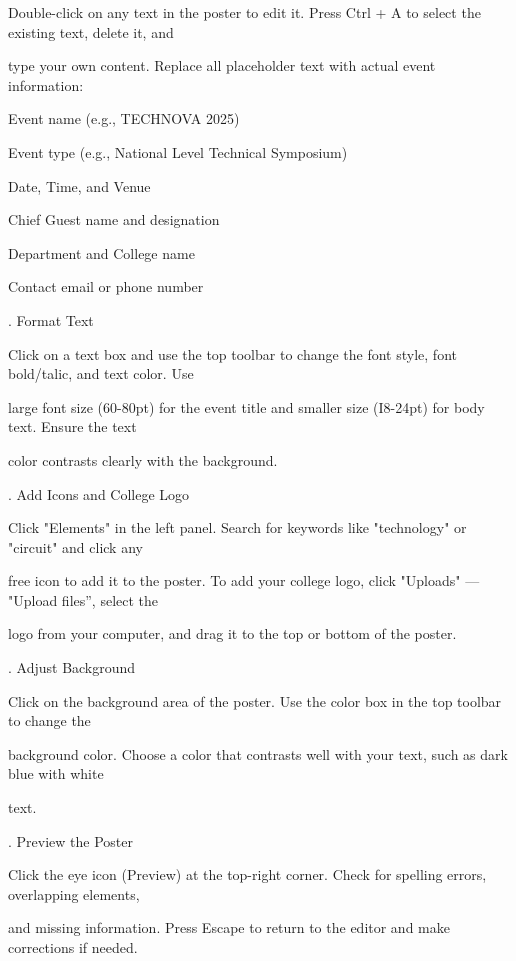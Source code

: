 \documentclass[10pt,a4paper]{article}
\begin{document}
\noindent Double-click on any text in the poster to edit it. Press Ctrl + A to select the existing text, delete it, and\par
\noindent type your own content. Replace all placeholder text with actual event information:\par
\noindent Event name (e.g., TECHNOVA 2025)\par
\noindent Event type (e.g., National Level Technical Symposium)\par
\noindent Date, Time, and Venue\par
\noindent Chief Guest name and designation\par
\noindent Department and College name\par
\noindent Contact email or phone number\par
{}. Format Text\par
\noindent Click on a text box and use the top toolbar to change the font style, font bold/talic, and text color. Use\par
\noindent large font size (60-80pt) for the event title and smaller size (I8-24pt) for body text. Ensure the text\par
\noindent color contrasts clearly with the background.\par
{}. Add Icons and College Logo\par
\noindent Click "Elements" in the left panel. Search for keywords like "technology" or "circuit" and click any\par
\noindent free icon to add it to the poster. To add your college logo, click "Uploads" — "Upload files”, select the\par
\noindent logo from your computer, and drag it to the top or bottom of the poster.\par
{}. Adjust Background\par
\noindent Click on the background area of the poster. Use the color box in the top toolbar to change the\par
\noindent background color. Choose a color that contrasts well with your text, such as dark blue with white\par
\noindent text.\par
{}. Preview the Poster\par
\noindent Click the eye icon (Preview) at the top-right corner. Check for spelling errors, overlapping elements,\par
\noindent and missing information. Press Escape to return to the editor and make corrections if needed.\par
\end{document}
